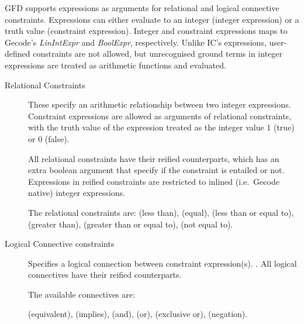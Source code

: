 GFD supports expressions as arguments for relational and logical connective
constraints. Expressions can either evaluate to an integer (integer 
expression) or a truth value (constraint expression). Integer and 
constraint expressions maps to Gecode's {\it LinIntExpr\/} and {\it BoolExpr}, 
respectively. Unlike IC's expressions, user-defined constraints are not
allowed, but unrecognised ground terms in integer expressions are treated as
arithmetic functions and evaluated.

\begin{description}
\item[Relational Constraints]
These specify an arithmetic relationship between two integer expressions.
Constraint expressions are allowed as arguments of relational constraints,
with the truth value of the expression treated as the integer value 1 (true)
or 0 (false). 

All relational constraints have their reified counterparts, which has an extra
boolean argument that specify if the constraint is entailed or not. Expressions
in reified constraints are restricted to inlined (i.e.\ Gecode native) integer
expressions.

The  relational constraints are:
 (less than),
 (equal), 
 (less than or equal to),
 (greater than),
 (greater than or equal to),
 (not equal to).

\item[Logical Connective constraints]
Specifies a logical connection between constraint expression(s). 
. 
All logical connectives have their reified counterparts.

The available connectives are:

 (equivalent),
 (implies),
 (and),
 (or),
 (exclusive or),
 (negation).


\end{description}
